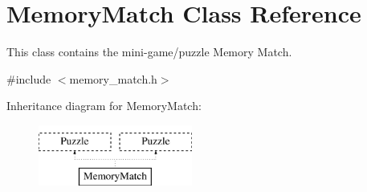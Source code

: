 \hypertarget{classMemoryMatch}{\section{Memory\-Match Class Reference}
\label{classMemoryMatch}
}


This class contains the mini-\/game/puzzle Memory Match.  




{\ttfamily \#include $<$memory\-\_\-match.\-h$>$}

Inheritance diagram for Memory\-Match\-:\begin{figure}[H]
\begin{center}
\leavevmode
\includegraphics[height=2.000000cm]{classMemoryMatch}
\end{center}
\end{figure}
